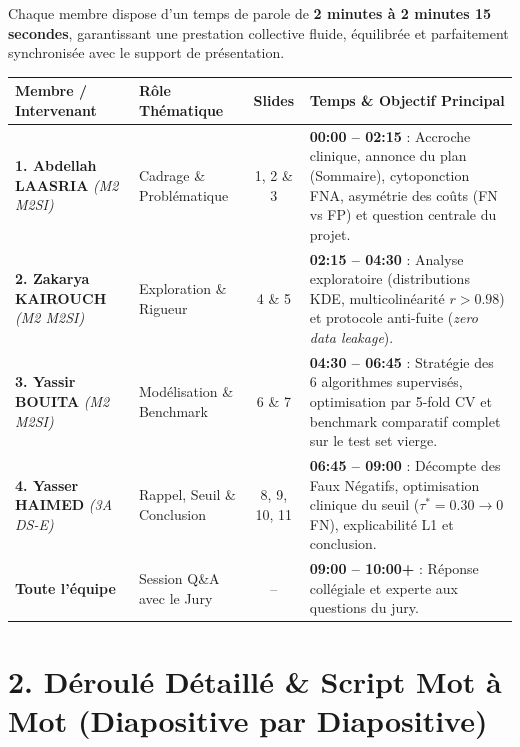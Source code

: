 \documentclass[a4paper,11pt]{article}
\begin{document}
Chaque membre dispose d'un temps de parole de \textbf{2 minutes à 2 minutes 15 secondes}, garantissant une prestation collective fluide, équilibrée et parfaitement synchronisée avec le support de présentation.

\begin{table}[h]
	\centering
	\small
	\begin{tabularx}{\textwidth}{llcX}
		\toprule
		\textbf{Membre / Intervenant} & \textbf{Rôle Thématique} & \textbf{Slides} & \textbf{Temps \& Objectif Principal} \\
		\midrule
		\textbf{1. Abdellah LAASRIA} \newline \textit{(M2 M2SI)} & Cadrage \& Problématique & 1, 2 \& 3 & \textbf{00:00 -- 02:15} : Accroche clinique, annonce du plan (Sommaire), cytoponction FNA, asymétrie des coûts (FN vs FP) et question centrale du projet. \\
		\midrule
		\textbf{2. Zakarya KAIROUCH} \newline \textit{(M2 M2SI)} & Exploration \& Rigueur & 4 \& 5 & \textbf{02:15 -- 04:30} : Analyse exploratoire (distributions KDE, multicolinéarité $r>0.98$) et protocole anti-fuite (\textit{zero data leakage}). \\
		\midrule
		\textbf{3. Yassir BOUITA} \newline \textit{(M2 M2SI)} & Modélisation \& Benchmark & 6 \& 7 & \textbf{04:30 -- 06:45} : Stratégie des 6 algorithmes supervisés, optimisation par 5-fold CV et benchmark comparatif complet sur le test set vierge. \\
		\midrule
		\textbf{4. Yasser HAIMED} \newline \textit{(3A DS-E)} & Rappel, Seuil \& Conclusion & 8, 9, 10, 11 & \textbf{06:45 -- 09:00} : Décompte des Faux Négatifs, optimisation clinique du seuil ($\tau^* = 0.30 \to 0$ FN), explicabilité L1 et conclusion. \\
		\midrule
		\textbf{Toute l'équipe} & Session Q\&A avec le Jury & -- & \textbf{09:00 -- 10:00+} : Réponse collégiale et experte aux questions du jury. \\
		\bottomrule
	\end{tabularx}
\end{table}

\vspace{0.2cm}

\section*{\color{primarygreen}2. Déroulé Détaillé \& Script Mot à Mot (Diapositive par Diapositive)}
\end{document}
